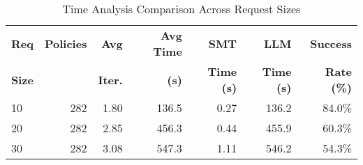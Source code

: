 \begin{table}[t]
\centering
\caption{Time Analysis Comparison Across Request Sizes}
\label{tab:time_comparison}
\begin{tabular}{lrrrrrr}
\toprule
\textbf{Req} & \textbf{Policies} & \textbf{Avg} & \textbf{Avg Time} & \textbf{SMT} & \textbf{LLM} & \textbf{Success} \\
\textbf{Size} & & \textbf{Iter.} & \textbf{(s)} & \textbf{Time (s)} & \textbf{Time (s)} & \textbf{Rate (\%)} \\
\midrule
10 & 282 & 1.80 & 136.5 & 0.27 & 136.2 & 84.0\% \\
20 & 282 & 2.85 & 456.3 & 0.44 & 455.9 & 60.3\% \\
30 & 282 & 3.08 & 547.3 & 1.11 & 546.2 & 54.3\% \\
\bottomrule
\end{tabular}
\end{table}
